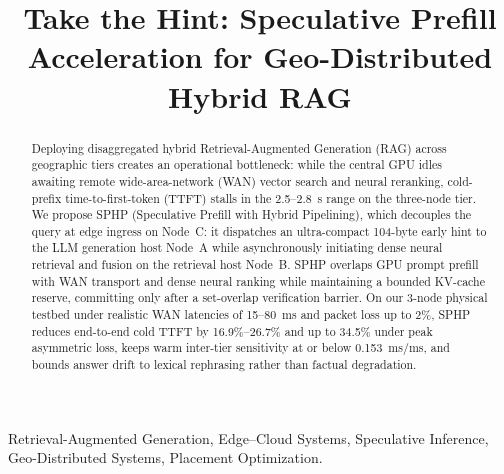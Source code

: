 \documentclass[conference,a4paper]{IEEEtran}
\begin{document}
\title{Take the Hint: Speculative Prefill Acceleration for Geo-Distributed Hybrid RAG}

\author{
}

\maketitle

\begin{abstract}
Deploying disaggregated hybrid Retrieval-Augmented Generation (RAG) across geographic tiers creates an operational bottleneck: while the central GPU idles awaiting remote wide-area-network (WAN) vector search and neural reranking, cold-prefix time-to-first-token (TTFT) stalls in the 2.5--2.8~s range on the three-node tier. We propose SPHP (Speculative Prefill with Hybrid Pipelining), which decouples the query at edge ingress on Node~C: it dispatches an ultra-compact 104-byte early hint to the LLM generation host Node~A while asynchronously initiating dense neural retrieval and fusion on the retrieval host Node~B. SPHP overlaps GPU prompt prefill with WAN transport and dense neural ranking while maintaining a bounded KV-cache reserve, committing only after a set-overlap verification barrier. On our 3-node physical testbed under realistic WAN latencies of 15--80~ms and packet loss up to 2\%, SPHP reduces end-to-end cold TTFT by 16.9\%--26.7\% and up to 34.5\% under peak asymmetric loss, keeps warm inter-tier sensitivity at or below 0.153~ms/ms, and bounds answer drift to lexical rephrasing rather than factual degradation.
\end{abstract}

\begin{IEEEkeywords}
Retrieval-Augmented Generation, Edge--Cloud Systems, Speculative Inference, Geo-Distributed Systems, Placement Optimization.
\end{IEEEkeywords}

\end{document}

